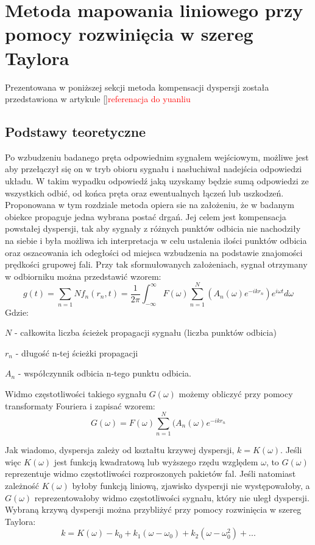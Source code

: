 
\section{Metoda mapowania liniowego przy pomocy rozwinięcia w szereg Taylora}
\label{sec:Taylor}
Prezentowana w poniższej sekcji metoda kompensacji dyspersji została przedstawiona w artykule []\textcolor{red}{referenacja do yuanliu}
\subsection{Podstawy teoretyczne}
Po wzbudzeniu badanego pręta odpowiednim sygnałem wejściowym, możliwe jest aby przełączył się on w tryb obioru sygnału i nasłuchiwał nadejścia odpowiedzi układu. W takim wypadku odpowiedź jaką uzyskamy będzie sumą odpowiedzi ze wszystkich odbić, od końca pręta oraz ewentualnych łączeń lub uszkodzeń.  Proponowana w tym rozdziale metoda opiera sie na założeniu, że w badanym obiekce propaguje jedna wybrana postać drgań. Jej celem jest kompensacja powstałej dyspersji, tak aby sygnały z różnych punktów odbicia nie nachodziły na siebie i była możliwa ich interpretacja w celu ustalenia ilości punktów odbicia oraz oszacowania ich odegłości od miejsca wzbudzenia na podstawie znajomości prędkości grupowej fali. Przy tak sformułowanych założeniach, sygnał otrzymany w odbiorniku można przedstawić wzorem:
\begin{equation}
g(t) = \sum\limits_{n=1}{N}f_n(r_n,t)=\frac{1}{2\pi}\int _{-\infty}^{\infty}F(\omega)\sum\limits_{n=1}^{N}(A_n(\omega)e^{-ikr_n})e^{i\omega t} d\omega \label{eq:g(t)_taylor}
\end{equation}
Gdzie:

$N$ - całkowita liczba ścieżek propagacji sygnału (liczba punktów odbicia)

$r_n$ - długość n-tej ścieżki propagacji

$A_n$ - współczynnik odbicia n-tego punktu odbicia.

Widmo częstotliwości takiego sygnału $G(\omega)$  możemy obliczyć przy pomocy transformaty Fouriera i zapisać wzorem:
\begin{equation}
G(\omega) = F(\omega)\sum\limits_{n=1}^{N}(A_n(\omega)e^{-ikr_n} \label{eq:G(omega)_taylor}
\end{equation}

Jak wiadomo, dyspersja zależy od kształtu krzywej dyspersji, $k = K(\omega)$. Jeśli więc $K(\omega)$ jest funkcją kwadratową lub wyższego rzędu względem $\omega$, to $G(\omega)$ reprezentuje widmo częstotliwości rozproszonych pakietów fal. Jeśli natomiast zależność $K(\omega)$ byłoby funkcją liniową, zjawisko dyspersji nie występowałoby, a $G(\omega)$ reprezentowałoby widmo częstotliwości sygnału, który nie uległ dyspersji. 
Wybraną krzywą dyspersji można przybliżyć przy pomocy rozwinięcia w szereg Taylora:
\begin{equation}
k = K(\omega) - k_0+k_1(\omega - \omega _0) + k_2(\omega - \omega _0^2)+... \label{eq:szereg_k}
\end{equation}

